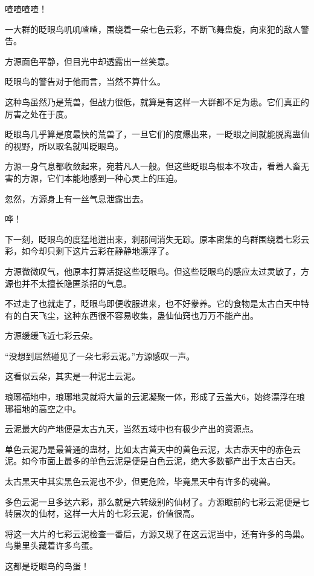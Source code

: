 
\begin{this_body}

喳喳喳喳！

一大群的眨眼鸟叽叽喳喳，围绕着一朵七色云彩，不断飞舞盘旋，向来犯的敌人警告。

方源面色平静，但目光中却透露出一丝笑意。

眨眼鸟的警告对于他而言，当然不算什么。

这种鸟虽然乃是荒兽，但战力很低，就算是有这样一大群都不足为患。它们真正的厉害之处在于度。

眨眼鸟几乎算是度最快的荒兽了，一旦它们的度爆出来，一眨眼之间就能脱离蛊仙的视野，所以取名就叫眨眼鸟。

方源一身气息都收敛起来，宛若凡人一般。但这些眨眼鸟根本不攻击，看着人畜无害的方源，它们本能地感到一种心灵上的压迫。

忽然，方源身上有一丝气息泄露出去。

哗！

下一刻，眨眼鸟的度猛地迸出来，刹那间消失无踪。原本密集的鸟群围绕着七彩云彩，如今却只剩下这片云彩在静静地漂浮了。

方源微微叹气，他原本打算活捉这些眨眼鸟。但这些眨眼鸟的感应太过灵敏了，方源也并不太擅长隐匿杀招的气息。

不过走了也就走了，眨眼鸟即便收服进来，也不好豢养。它的食物是太古白天中特有的白天飞尘，这种东西很不容易收集，蛊仙仙窍也万万不能产出。

方源缓缓飞近七彩云朵。

“没想到居然碰见了一朵七彩云泥。”方源感叹一声。

这看似云朵，其实是一种泥土云泥。

琅琊福地中，琅琊地灵就将大量的云泥凝聚一体，形成了云盖大6，始终漂浮在琅琊福地的高空之中。

云泥最大的产地便是太古九天，当然五域中也有极少产出的资源点。

单色云泥乃是最普通的蛊材，比如太古黄天中的黄色云泥，太古赤天中的赤色云泥。如今市面上最多的单色云泥是便是白色云泥，绝大多数都产出于太古白天。

太古黑天中其实黑色云泥也不少，但更危险，毕竟黑天中有许多的魂兽。

多色云泥一旦多达六彩，那么就是六转级别的仙材了。方源眼前的七彩云泥便是七转层次的仙材，这样一大片的七彩云泥，价值很高。

将这一大片的七彩云泥检查一番后，方源又现了在这云泥当中，还有许多的鸟巢。鸟巢里头藏着许多鸟蛋。

这都是眨眼鸟的鸟蛋！


\end{this_body}
